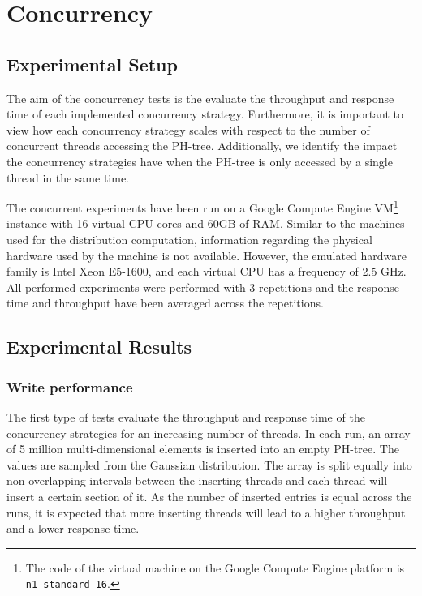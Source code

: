 \documentclass[11pt,a4paper]{globis-book}
\begin{document}
\section{Concurrency}
\label{sec:evaluation-concurrency}

\subsection{Experimental Setup}
\label{subsec:exp-conc}
The aim of the concurrency tests is the evaluate the throughput and response time of each implemented concurrency strategy. Furthermore, it is important to view how each concurrency strategy scales with respect to the number of concurrent threads accessing the PH-tree. Additionally, we identify the impact the concurrency strategies have when the PH-tree is only accessed by a single thread in the same time.

The concurrent experiments have been run on a Google Compute Engine VM\footnote{The code of the virtual machine on the Google Compute Engine platform is \texttt{n1-standard-16}.} instance with 16 virtual CPU cores and 60GB of RAM. Similar to the machines used for the distribution computation, information regarding the physical hardware used by the machine is not available. However, the emulated hardware family is Intel Xeon E5-1600, and each virtual CPU has a frequency of 2.5 GHz. All performed experiments were performed with 3 repetitions and the response time and throughput have been averaged across the repetitions. 

\subsection{Experimental Results}
\subsubsection{Write performance}

The first type of tests evaluate the throughput and response time of the concurrency strategies for an increasing number of threads. In each run, an array of 5 million multi-dimensional elements is inserted into an empty PH-tree. The values are sampled from the Gaussian distribution. The array is split equally into non-overlapping intervals between the inserting threads and each thread will insert a certain section of it. As the number of inserted entries is equal across the runs, it is expected that more inserting threads will lead to a higher throughput and a lower response time.
\end{document}
